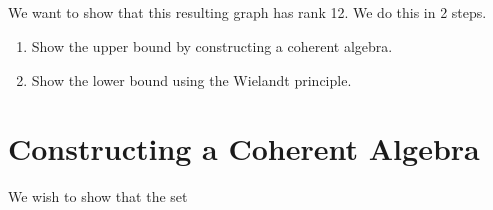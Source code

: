 \documentclass{article}
\begin{document}
\subsection*{}

We want to show that this resulting graph has rank 12. We do this in 2 steps.

\begin{enumerate}
    \item Show the upper bound by constructing a coherent algebra.
    \item Show the lower bound using the Wielandt principle.
\end{enumerate}

\section{Constructing a Coherent Algebra}

We wish to show that the set
\end{document}
